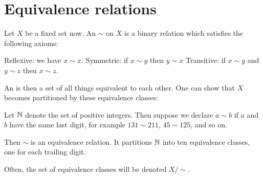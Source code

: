 \section{Equivalence relations}
Let $X$ be a fixed set now.
An  $\sim$ on $X$ is a binary relation
which satisfies the following axioms:
\begin{itemize}
	\ii Reflexive: we have $x \sim x$.
	\ii Symmetric: if $x \sim y$ then $y \sim x$
	\ii Transitive: if $x \sim y$ and $y \sim z$ then $x \sim z$.
\end{itemize}
An  is then a
set of all things equivalent to each other.
One can show that $X$ becomes partitioned by these equivalence classes:

\begin{example}
	Let $\mathbb N$ denote the set of positive integers.
	Then suppose we declare $a \sim b$ if $a$ and $b$ have the same last digit,
	for example $131 \sim 211$, $45 \sim 125$, and so on.

	Then $\sim$ is an equivalence relation.
	It partitions $\mathbb N$ into ten equivalence classes,
	one for each trailing digit.
\end{example}

Often, the set of equivalence classes will be denoted $X/{\sim}$.

